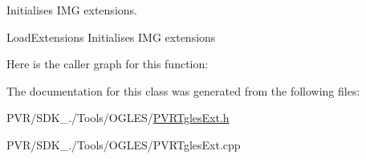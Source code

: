Initialises I\+M\+G extensions. 







  Load\+Extensions  Initialises I\+M\+G extensions 

Here is the caller graph for this function\+:




The documentation for this class was generated from the following files\+:\begin{DoxyCompactItemize}
\item 
P\+V\+R/\+S\+D\+K\+\_./\+Tools/\+O\+G\+L\+E\+S/\hyperlink{_p_v_r_tgles_ext_8h}{P\+V\+R\+Tgles\+Ext.\+h}\item 
P\+V\+R/\+S\+D\+K\+\_./\+Tools/\+O\+G\+L\+E\+S/P\+V\+R\+Tgles\+Ext.\+cpp\end{DoxyCompactItemize}
